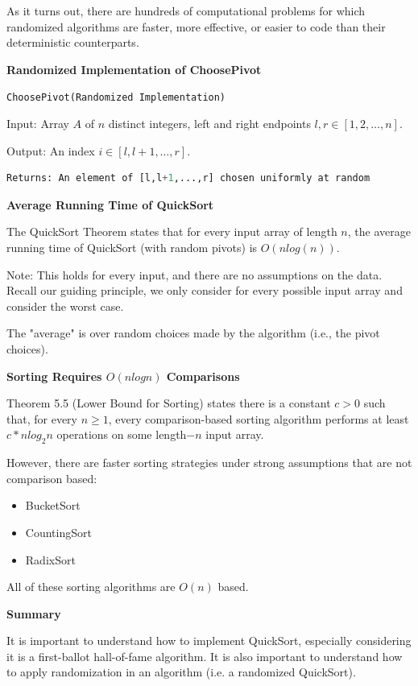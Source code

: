 \documentclass[11pt]{article}
\newcommand{\boldsec}[1]{
    \vspace{11pt}
    \textbf{#1}
    \vspace{11pt}
}
\begin{document}
As it turns out, there are hundreds of computational problems for which randomized algorithms are faster, more effective, or easier to code than their deterministic counterparts.

\boldsec{Randomized Implementation of ChoosePivot}

\texttt{ChoosePivot(Randomized Implementation)}

Input: Array $A$ of $n$ distinct integers, left and right endpoints $l,r\in[1,2,\dots,n]$.

Output: An index $i \in [l,l+1,\dots,r]$.

\vspace{11pt}
\begin{lstlisting}[language=python, breaklines=true]
Returns: An element of [l,l+1,...,r] chosen uniformly at random    
\end{lstlisting}

\boldsec{Average Running Time of QuickSort}

The QuickSort Theorem states that for every input array of length $n$, the average running time of QuickSort (with random pivots) is $O(nlog(n))$.

Note: This holds for every input, and there are no assumptions on the data. Recall our guiding principle, we only consider for every possible input array and consider the worst case.

The "average" is over random choices made by the algorithm (i.e., the pivot choices).

\boldsec{Sorting Requires $O(nlogn)$ Comparisons}

Theorem 5.5 (Lower Bound for Sorting) states there is a constant $c > 0$ such that, for every $n \geq 1$, every comparison-based sorting algorithm performs at least $c *nlog_2n$ operations on some length$-n$  input array.

However, there are faster sorting strategies under strong assumptions that are not comparison based:
\begin{itemize}
    \item BucketSort
    \item CountingSort
    \item RadixSort
\end{itemize}

All of these sorting algorithms are $O(n)$ based.

\boldsec{Summary}

It is important to understand how to implement QuickSort, especially considering it is a first-ballot hall-of-fame algorithm. It is also important to understand how to apply randomization in an algorithm (i.e. a randomized QuickSort).
\end{document}
